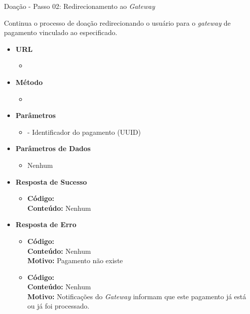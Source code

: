 \begin{caixa}{Doação - Passo 02: Redirecionamento ao \emph{Gateway}}{}

Continua o processo de doação redirecionando o usuário para o \emph{gateway} de pagamento vinculado ao  especificado.

\begin{itemize}
\item \textbf{URL}
	\begin{itemize}
		\item {}
	\end{itemize}

\item \textbf{Método}
	\begin{itemize}
		\item {}
	\end{itemize}

\item \textbf{Parâmetros}
	\begin{itemize}
		\item {} - Identificador do pagamento (UUID)
	\end{itemize}

\item \textbf{Parâmetros de Dados}
	\begin{itemize}
        \item Nenhum
	\end{itemize}

\item \textbf{Resposta de Sucesso}
	\begin{itemize}
		\item \textbf{Código:}  \\ \textbf{Conteúdo:} Nenhum
	\end{itemize}

\item \textbf{Resposta de Erro}
	\begin{itemize}
		\item \textbf{Código:}  \\ \textbf{Conteúdo:} Nenhum \\ \textbf{Motivo:} Pagamento não existe
        \item \textbf{Código:}  \\ \textbf{Conteúdo:} Nenhum \\ \textbf{Motivo:} Notificações do \emph{Gateway} informam que este pagamento já está ou já foi processado.
	\end{itemize}

\end{itemize}
\end{caixa}

